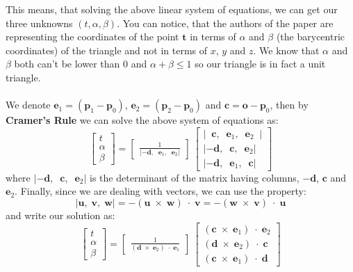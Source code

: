 \documentclass[11pt,a4paper]{article}
\begin{document}
	This means, that solving the above linear system of equations, we can get our three unknowns $(t, \alpha, \beta)$. You can notice, that the authors of the paper are representing the coordinates of the point $\boldsymbol{t}$ in terms of $\alpha$ and $\beta$ (the barycentric coordinates) of the triangle and not in terms of $x$, $y$ and $z$. We know that $\alpha$ and $\beta$ both can't be lower than $0$ and $\alpha + \beta \le 1$ so our triangle is in fact a unit triangle.\\~\\
	\noindent
	We denote $\boldsymbol{e}_{1} = (\boldsymbol{p}_{1} - \boldsymbol{p}_{0})$, $\boldsymbol{e}_{2} = (\boldsymbol{p}_{2} - \boldsymbol{p}_{0})$ and $\boldsymbol{c} = \boldsymbol{o} - \boldsymbol{p}_{0}$, then by \textbf{Cramer's Rule} \cite{cramersrule} we can solve the above system of equations as:
	\[
	\begin{bmatrix}
		t \\
		\alpha \\
		\beta 
	\end{bmatrix} = \left[
	\begin{array}{ccc}
		\frac{1}{|-\boldsymbol{d},\;\;\boldsymbol{e}_{1},\;\;\boldsymbol{e}_{2}|}
	\end{array}
	\right]
	\
	\begin{bmatrix}
		|\;\;\boldsymbol{c},\;\;\boldsymbol{e}_{1},\;\;\boldsymbol{e}_{2}\;\;| \\
		|-\boldsymbol{d},\;\;\boldsymbol{c},\;\;\boldsymbol{e}_{2}| \\
		|-\boldsymbol{d},\;\;\boldsymbol{e}_{1},\;\;\boldsymbol{c}|
	\end{bmatrix}
	\]
	where $|-\boldsymbol{d},\;\;\boldsymbol{c},\;\;\boldsymbol{e}_{2}|$ is the determinant of the matrix having columns, $-\boldsymbol{d}$, $\boldsymbol{c}$ and $\boldsymbol{e}_{2}$. Finally, since we are dealing with vectors, we can use the property: 
	\begin{equation}
		|\boldsymbol{u},\;\boldsymbol{v},\;\boldsymbol{w}| = -(\boldsymbol{u}\;\times\;\boldsymbol{w})\;\cdot\;\boldsymbol{v} = -(\boldsymbol{w}\;\times\;\boldsymbol{v})\;\cdot\;\boldsymbol{u}
	\end{equation}
	and write our solution as:
	\[
	\begin{bmatrix}
		t \\
		\alpha \\
		\beta
	\end{bmatrix} = \left[
	\begin{array}{ccc}
		\frac{1}{(\boldsymbol{d}\;\times\;\boldsymbol{e}_{2})\;\cdot\;\boldsymbol{e}_{1}}
	\end{array}
	\right]
	\
	\begin{bmatrix}
		(\boldsymbol{c}\;\times\;\boldsymbol{e}_{1})\;\cdot\;\boldsymbol{e}_{2} \\
		(\boldsymbol{d}\;\times\;\boldsymbol{e}_{2})\;\cdot\;\boldsymbol{c} \\
		(\boldsymbol{c}\;\times\;\boldsymbol{e}_{1})\;\cdot\;\boldsymbol{d}
	\end{bmatrix}
	\]
\end{document}
